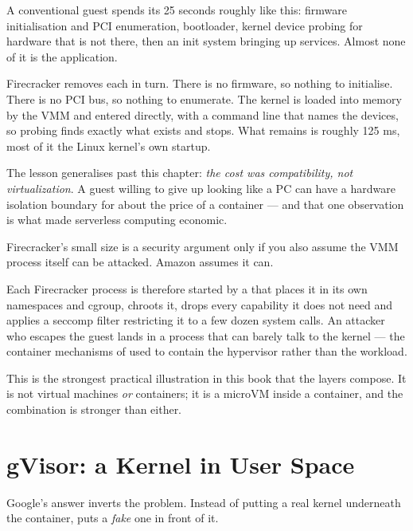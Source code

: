 \begin{conceptbox}
A conventional guest spends its 25 seconds roughly like this: firmware
initialisation and PCI enumeration, bootloader, kernel device probing for
hardware that is not there, then an init system bringing up services. Almost
none of it is the application.

\smallskip
Firecracker removes each in turn. There is no firmware, so nothing to
initialise. There is no PCI bus, so nothing to enumerate. The kernel is loaded
into memory by the VMM and entered directly, with a command line that names the
devices, so probing finds exactly what exists and stops. What remains is
roughly 125 ms, most of it the Linux kernel's own startup.

\smallskip
The lesson generalises past this chapter: \emph{the cost was compatibility, not
virtualization}. A guest willing to give up looking like a PC can have a
hardware isolation boundary for about the price of a container --- and that one
observation is what made serverless computing economic.
\end{conceptbox}

\begin{alertbox}
Firecracker's small size is a security argument only if you also assume the VMM
process itself can be attacked. Amazon assumes it can.

\smallskip
Each Firecracker process is therefore started by a  that places it
in its own namespaces and cgroup, chroots it, drops every capability it does
not need and applies a seccomp filter restricting it to a few dozen system
calls. An attacker who escapes the guest lands in a process that can barely
talk to the kernel --- the container mechanisms of  used to
contain the hypervisor rather than the workload.

\smallskip
This is the strongest practical illustration in this book that the layers
compose. It is not virtual machines \emph{or} containers; it is a microVM
inside a container, and the combination is stronger than either.
\end{alertbox}

\section{gVisor: a Kernel in User Space}

Google's answer inverts the problem. Instead of putting a real kernel
underneath the container,  puts a \emph{fake} one in front of it.

